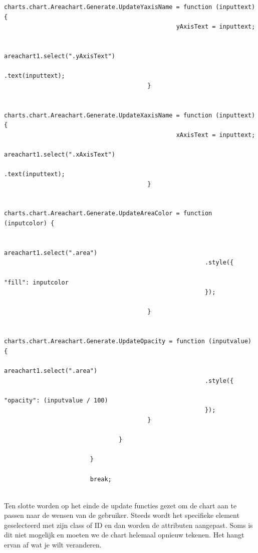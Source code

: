 \begin{lstlisting}[gobble=24]                                       
                                        charts.chart.Areachart.Generate.UpdateYaxisName = function (inputtext) {
                                                yAxisText = inputtext;

                                                areachart1.select(".yAxisText")
                                                        .text(inputtext);
                                        }

                                        charts.chart.Areachart.Generate.UpdateXaxisName = function (inputtext) {
                                                xAxisText = inputtext;
                                                areachart1.select(".xAxisText")
                                                        .text(inputtext);
                                        }

                                        charts.chart.Areachart.Generate.UpdateAreaColor = function (inputcolor) {
                                                
                                                areachart1.select(".area")
                                                        .style({
                                                                "fill": inputcolor
                                                        });

                                        }

                                        charts.chart.Areachart.Generate.UpdateOpacity = function (inputvalue) {
                                                areachart1.select(".area")
                                                        .style({
                                                                "opacity": (inputvalue / 100)
                                                        });
                                        }

                                }

                        }

                        break;
                          
\end{lstlisting}

Ten slotte worden op het einde de update functies gezet om de chart aan te passen naar de wensen van de gebruiker. Steeds wordt het specifieke element geselecteerd met zijn class of ID en dan worden de attributen aangepast. Soms is dit niet mogelijk en moeten we de chart helemaal opnieuw tekenen. Het hangt ervan af wat je wilt veranderen.

